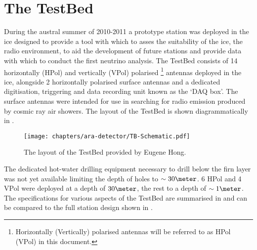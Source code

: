 \section{The TestBed}
\label{sec:ara-detector:TestBed}

During the austral summer of 2010-2011 a prototype station was deployed in the ice designed to provide a tool with which to asses the suitability of the ice, the radio environment, to aid the development of future stations and provide data with which to conduct the first neutrino analysis. The TestBed consists of 14 horizontally (HPol) and vertically (VPol) polarised \footnote{Horizontally (Vertically) polarised antennas will be referred to as HPol (VPol) in this document.} antennas deployed in the ice, alongside 2 horizontally polarised surface antennas and a dedicated digitisation, triggering and data recording unit known as the `DAQ box'. The surface antennas were intended for use in searching for radio emission produced by cosmic ray air showers. The layout of the TestBed is shown diagrammatically in .

\begin{figure}[htpb]
  \centering
  \texttt{[image: chapters/ara-detector/TB-Schematic.pdf]}
  \caption{The layout of the TestBed provided by Eugene Hong.}
  \label{fig:ara-detector:TestBed:Schematic}
\end{figure}

The dedicated hot-water drilling equipment necessary to drill below the firn layer was not yet available limiting the depth of holes to $\sim 30 \meter$. 6 HPol and 4 VPol were deployed at a depth of $30 \meter$, the rest to a depth of $\sim 1 \meter$. The specifications for various aspects of the TestBed are summarised in  and can be compared to the full station design shown in .


